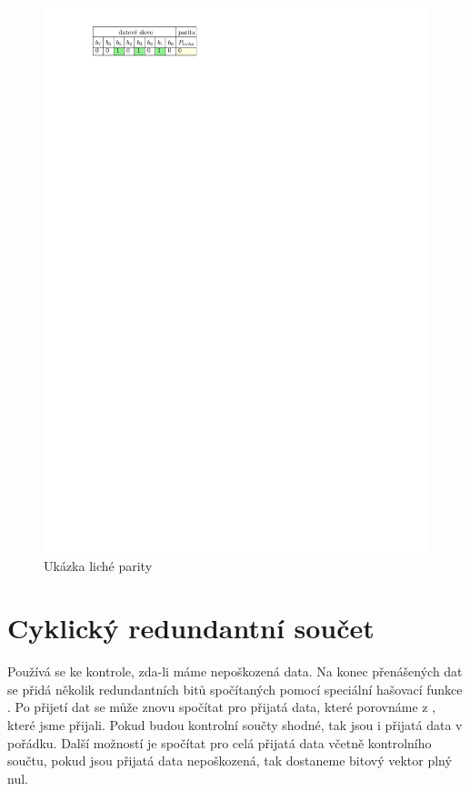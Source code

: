 \begin{figure}[H]
    \begin{center}
        \includegraphics[scale=1]{img/parita_licha}
    \end{center}
    \caption{Ukázka liché parity}
\end{figure}

\section{Cyklický redundantní součet}
Používá se ke kontrole, zda-li máme nepoškozená data. Na konec přenášených dat se přidá několik redundantních bitů spočítaných pomocí speciální hašovací funkce . Po přijetí dat se může znovu spočítat  pro přijatá data, které porovnáme z , které jsme přijali. Pokud budou kontrolní součty shodné, tak jsou i přijatá data v pořádku. Další možností je spočítat  pro celá přijatá data včetně kontrolního součtu, pokud jsou přijatá data nepoškozená,  tak dostaneme bitový vektor plný nul.

